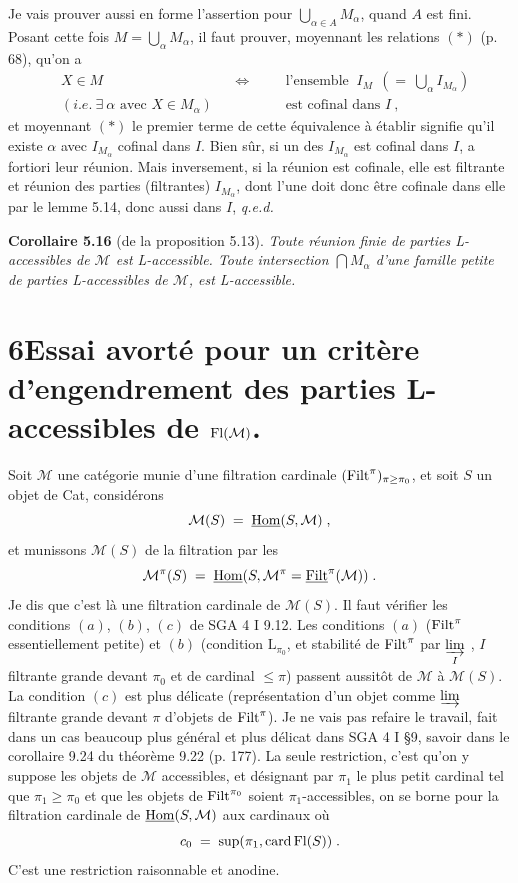 Je vais prouver aussi en forme l'assertion pour $\bigcup_{\alpha\in A} M_{\alpha}$, quand $A$ est fini. Posant cette fois $M = \bigcup_{\alpha} M_{\alpha}$, il faut prouver, moyennant les relations $(*)$ (p. 68), qu'on a
\[
\begin{aligned}
&X \in M &&\Longleftrightarrow \quad &&\text{l'ensemble } \ I_{M} \ \ (= \ \textstyle\bigcup_{\alpha} I_{M_{\alpha}})\\
&(\textit{i.e.} \ \exists \ \alpha \text{ avec } X \in M_{\alpha}) && &&\text{est cofinal dans } I \ ,
\end{aligned}
\tag*{$(**)$}
\]
et moyennant $(*)$ le premier terme de cette équivalence à établir signifie qu'il existe $\alpha$ avec $I_{M_{\alpha}}$ cofinal dans $I$. Bien sûr, si un des $I_{M_{\alpha}}$ est cofinal dans $I$, a fortiori leur réunion. Mais inversement, si la réunion est cofinale, elle est filtrante et réunion des parties (filtrantes) $I_{M_{\alpha}}$, dont l'une doit donc être cofinale dans elle par le lemme 5.14, donc aussi dans $I$, \textit{q.e.d.}

\textbf{Corollaire 5.16} (de la proposition 5.13). \textit{Toute réunion finie de parties L-accessibles de $\mathcal{M}$ est L-accessible. Toute intersection $\bigcap M_{\alpha}$ d'une famille petite de parties L-accessibles de $\mathcal{M}$, est L-accessible.}


\section*{6\quad Essai avorté pour un critère d'engendrement des parties L-accessibles de $\mathrm{Fl}(\mathcal{M})$.}

Soit $\mathcal{M}$ une catégorie munie d'une filtration cardinale $(\mathrm{Filt}^{\pi})_{\pi\geq\pi_{0}}$, et soit $S$ un objet de Cat, considérons
\[
\mathcal{M}(S) \;=\; \underline{\mathrm{Hom}}(S,\mathcal{M}) \; ,
\]
et munissons $\mathcal{M}(S)$ de la filtration par les
\[
\mathcal{M}^{\pi}(S) \;=\; \underline{\mathrm{Hom}}(S,\mathcal{M}^{\pi} = \underline{\mathrm{Filt}}^{\pi}(\mathcal{M})) \; .
\]
Je dis que c'est là une filtration cardinale de $\mathcal{M}(S)$. Il faut vérifier les conditions $(a)$, $(b)$, $(c)$ de SGA 4 I 9.12. Les conditions $(a)$ ($\mathrm{Filt}^{\pi}$ essentiellement petite) et $(b)$ (condition $\mathrm{L}_{\pi_{0}}$, et stabilité de $\mathrm{Filt}^{\pi}$ par $\varinjlim\limits_{I}$ , $I$ filtrante grande devant $\pi_{0}$ et de cardinal $\leq \pi$) passent aussitôt de $\mathcal{M}$ à $\mathcal{M}(S)$. La condition $(c)$ est plus délicate (représentation
d'un objet comme $\varinjlim$ filtrante grande devant $\pi$ d'objets de $\mathrm{Filt}^{\pi}$). Je ne vais pas refaire le travail, fait dans un cas beaucoup plus général et plus délicat dans SGA 4 I §9, savoir dans le corollaire 9.24 du théorème 9.22 (p. 177). La seule restriction, c'est qu'on y suppose les objets de $\mathcal{M}$ accessibles, et désignant par $\pi_{1}$ le plus petit cardinal tel que $\pi_{1} \geq \pi_{0}$ et que les objets de $\mathrm{Filt}^{\pi_{0}}$ soient $\pi_{1}$-accessibles, on se borne pour la filtration cardinale de $\underline{\mathrm{Hom}}(S,\mathcal{M})$ aux cardinaux  où
\[
c_{0} \;=\; \sup(\pi_{1}, \operatorname{card} \mathrm{Fl}(S)) \; .
\]
C'est une restriction raisonnable et anodine.

